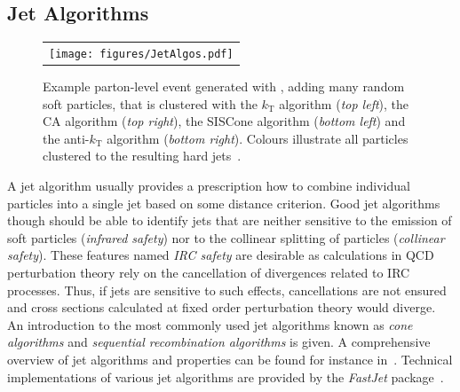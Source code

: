 \subsection{Jet Algorithms}
\label{subsec:jets_algos}
\begin{figure}[!tp]
  \centering 
  \begin{tabular}{c}
    \texttt{[image: figures/JetAlgos.pdf]} 
  \end{tabular}
  \caption{Example parton-level event generated with \herwig, adding many random soft particles, that is clustered with the $k_\mathrm{T}$ algorithm (\textit{top left}), the CA algorithm (\textit{top right}), the SISCone algorithm (\textit{bottom left}) and the anti-$k_\mathrm{T}$ algorithm (\textit{bottom right}). Colours illustrate all particles clustered to the resulting hard jets~\cite{Salam:2009jx}.}
  \label{fig:jet_algos}
\end{figure}
A jet algorithm usually provides a prescription how to combine individual particles into a single jet based on some distance criterion. Good jet algorithms though should be able to identify jets that are neither sensitive to the emission of soft particles (\textit{infrared safety}) nor to the collinear splitting of particles (\textit{collinear safety}). These features named \textit{IRC safety} are desirable as calculations in QCD perturbation theory rely on the cancellation of divergences related to IRC processes. Thus, if jets are sensitive to such effects, cancellations are not ensured and cross sections calculated at fixed order perturbation theory would diverge. \\
An introduction to the most commonly used jet algorithms known as \textit{cone algorithms} and \textit{sequential recombination algorithms} is given. A comprehensive overview of jet algorithms and properties can be found for instance in~\cite{Salam:2009jx}. Technical implementations of various jet algorithms are provided by the \textit{FastJet} package~\cite{Cacciari:2011ma, Cacciari:2005hq}.
\ \\
